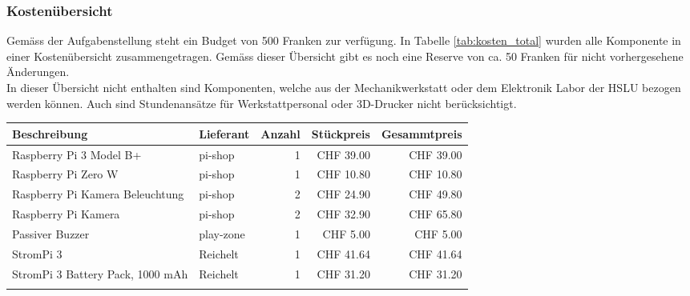 \documentclass[../../main.tex]{subfiles}
\begin{document}
\subsubsection{Kostenübersicht}
Gemäss der Aufgabenstellung steht ein Budget von 500 Franken zur verfügung. In Tabelle \ref{tab:kosten_total} wurden alle Komponente in einer Kostenübersicht zusammengetragen. Gemäss dieser Übersicht gibt es noch eine Reserve von ca. 50 Franken für nicht vorhergesehene Änderungen.\\
In dieser Übersicht nicht enthalten sind Komponenten, welche aus der Mechanikwerkstatt oder dem Elektronik Labor der
HSLU bezogen werden können. Auch sind Stundenansätze für Werkstattpersonal oder 3D-Drucker nicht berücksichtigt. \\

\begin{table}[H] \centering
    \begin{tabular}{|p{6cm}|l|r|r|r|}
    \hline
    \textbf{Beschreibung}                                   & \textbf{Lieferant} & \textbf{Anzahl} & \textbf{Stückpreis} & \textbf{Gesammtpreis} \\ \hline
    Raspberry Pi 3 Model B+                                 & pi-shop            & 1               & CHF 39.00           & CHF 39.00             \\ \hline \nocite{PiShopPi3ModelBp}
    Raspberry Pi Zero W                                     & pi-shop            & 1               & CHF 10.80           & CHF 10.80             \\ \hline \nocite{PiShopPiZero}
    Raspberry Pi Kamera Beleuchtung                         & pi-shop            & 2               & CHF 24.90           & CHF 49.80             \\ \hline \nocite{PiShopBrightPi}
    Raspberry Pi Kamera                                     & pi-shop            & 2               & CHF 32.90           & CHF 65.80             \\ \hline \nocite{PiShopPiKamera}
    Passiver Buzzer                                         & play-zone          & 1               & CHF 5.00            & CHF 5.00              \\ \hline \nocite{PlayZonePassiverBuzzer}
    StromPi 3                                               & Reichelt           & 1               & CHF 41.64           & CHF 41.64             \\ \hline \nocite{ReicheltStromPi}
    StromPi 3 Battery Pack, 1000 mAh                        & Reichelt           & 1               & CHF 31.20           & CHF 31.20             \\ \hline \nocite{ReicheltStromPiAkku}

\end{tabular}
\end{table}
\end{document}
